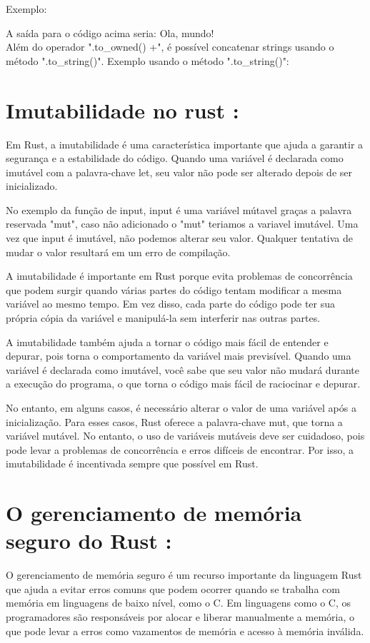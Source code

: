 \documentclass[12pt,a4paper,oneside]{abntex2}
\begin{document}
Exemplo:


A saída para o código acima seria:
Ola, mundo!\\

Além do operador ".to\_owned() +", é possível concatenar strings usando o método ".to\_string()". Exemplo usando o método ".to\_string()":




\section{Imutabilidade no rust :}
Em Rust, a imutabilidade é uma característica importante que ajuda a garantir a segurança e a estabilidade do código. Quando uma variável é declarada como imutável com a palavra-chave let, seu valor não pode ser alterado depois de ser inicializado. 

No exemplo da função de input, input é uma variável mútavel graças a palavra reservada "mut", caso não adicionado o "mut" teriamos a variavel imutável. Uma vez que input é imutável, não podemos alterar seu valor. Qualquer tentativa de mudar o valor resultará em um erro de compilação.

A imutabilidade é importante em Rust porque evita problemas de concorrência que podem surgir quando várias partes do código tentam modificar a mesma variável ao mesmo tempo. Em vez disso, cada parte do código pode ter sua própria cópia da variável e manipulá-la sem interferir nas outras partes.

A imutabilidade também ajuda a tornar o código mais fácil de entender e depurar, pois torna o comportamento da variável mais previsível. Quando uma variável é declarada como imutável, você sabe que seu valor não mudará durante a execução do programa, o que torna o código mais fácil de raciocinar e depurar.

No entanto, em alguns casos, é necessário alterar o valor de uma variável após a inicialização. Para esses casos, Rust oferece a palavra-chave mut, que torna a variável mutável. No entanto, o uso de variáveis mutáveis deve ser cuidadoso, pois pode levar a problemas de concorrência e erros difíceis de encontrar. Por isso, a imutabilidade é incentivada sempre que possível em Rust.
\section{O gerenciamento de memória seguro do Rust :} 
O gerenciamento de memória seguro é um recurso importante da linguagem Rust que ajuda a evitar erros comuns que podem ocorrer quando se trabalha com memória em linguagens de baixo nível, como o C. Em linguagens como o C, os programadores são responsáveis por alocar e liberar manualmente a memória, o que pode levar a erros como vazamentos de memória e acesso à memória inválida.
\end{document}
